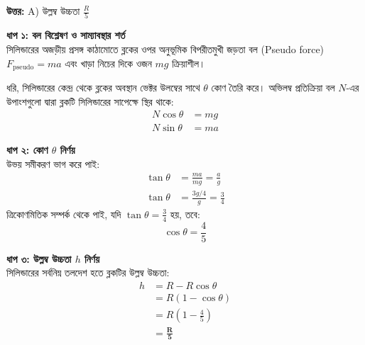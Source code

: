 \documentclass[12pt, a4paper]{article}
\begin{document}
\vspace{0.5em}
\begin{tcolorbox}[answerbox]
    \textbf{\color{success} উত্তর:} A) উল্লম্ব উচ্চতা $\frac{R}{5}$
\end{tcolorbox}
\vspace{1em}

\begin{tcolorbox}[solutionbox={সমাধান (Solution)}]
    \noindent
    \textbf{ধাপ ১: বল বিশ্লেষণ ও সাম্যাবস্থার শর্ত} \\
    সিলিন্ডারের অজড়ীয় প্রসঙ্গ কাঠামোতে ব্লকের ওপর অনুভূমিক বিপরীতমুখী জড়তা বল (Pseudo force) $F_{\text{pseudo}} = ma$ এবং খাড়া নিচের দিকে ওজন $mg$ ক্রিয়াশীল।
    
    ধরি, সিলিন্ডারের কেন্দ্র থেকে ব্লকের অবস্থান ভেক্টর উলম্বের সাথে $\theta$ কোণ তৈরি করে। অভিলম্ব প্রতিক্রিয়া বল $N$-এর উপাংশগুলো দ্বারা ব্লকটি সিলিন্ডারের সাপেক্ষে স্থির থাকে:
    \begin{align*}
        N \cos\theta &= mg \\
        N \sin\theta &= ma
    \end{align*}
    
    \vspace{0.5em}
    \noindent\textbf{ধাপ ২: কোণ $\theta$ নির্ণয়} \\
    উভয় সমীকরণ ভাগ করে পাই:
    \begin{align*}
        \tan\theta &= \frac{ma}{mg} = \frac{a}{g} \\
        \tan\theta &= \frac{3g/4}{g} = \frac{3}{4}
    \end{align*}
    ত্রিকোণমিতিক সম্পর্ক থেকে পাই, যদি $\tan\theta = \frac{3}{4}$ হয়, তবে:
    \[ \cos\theta = \frac{4}{5} \]
    
    \vspace{0.5em}
    \noindent\textbf{ধাপ ৩: উল্লম্ব উচ্চতা $h$ নির্ণয়} \\
    সিলিন্ডারের সর্বনিম্ন তলদেশ হতে ব্লকটির উল্লম্ব উচ্চতা:
    \begin{align*}
        h &= R - R \cos\theta \\
          &= R (1 - \cos\theta) \\
          &= R \left(1 - \frac{4}{5}\right) \\
          &= \mathbf{\frac{R}{5}}
    \end{align*}
\end{tcolorbox}

\newpage
\end{document}
